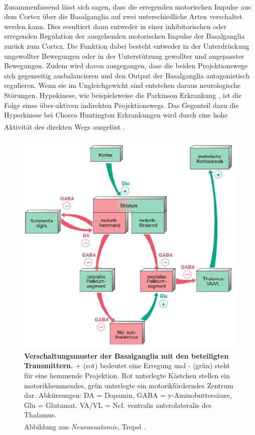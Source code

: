 \\ \noindent Zusammenfassend lässt sich sagen, dass die erregenden motorischen Impulse aus dem Cortex über die Basalganglia auf zwei unterschiedliche Arten verschaltet werden kann. Dies resultiert dann entweder in einer inhibitorischen oder erregenden Regulation der ausgehenden motorischen Impulse der Basalganglia zurück zum Cortex. Die Funktion dabei besteht entweder in der Unterdrückung ungewollter Bewegungen oder in der Unterstützung gewollter und angepasster Bewegungen. Zudem wird davon ausgegangen, dass die beiden Projektionswege sich gegenseitig ausbalancieren und den Output der Basalganglia antagonistisch regulieren. Wenn sie im Ungleichgewicht sind entstehen daraus neurologische Störungen. Hypokinese, wie beispielsweise die Parkinson Erkrankung , ist die Folge eines über-aktiven indirekten Projektionswegs. Das Gegenteil dazu die Hyperkinese bei Chorea Huntington  Erkrankungen wird durch eine hohe Aktivität des direkten Wegs ausgelöst \textsuperscript{\cite[Kap.~17]{paxinos2014rat}}. 

\begin{figure}[H]
    \centering
    \includegraphics{pictures/Basalganglia/verschaltung_Basalganglien.PNG}
    \caption[Verschaltungsmuster der Basalganglia mit den beteiligten Transmittern]{\textbf{Verschaltungsmuster der Basalganglia mit den beteiligten Transmittern.} + (rot) bedeutet eine Erregung und - (grün)  steht für eine hemmende Projektion. Rot unterlegte Kästchen stellen ein motorikhemmendes, grün unterlegte ein motorikförderndes Zentrum dar. Abkürzungen: DA = Dopamin, GABA = y-Aminobuttersäure, Glu = Glutamat. VA/VL = Ncl. ventralis anterolateralis des Thalamus. \\ Abbildung aus \textit{Neuroanatomie}, Trepel \textsuperscript{\cite[Kap.~9]{trepel2011neuroanatomie}}.}
    \label{fig:Verschaltung_Basalganglia}
\end{figure}

